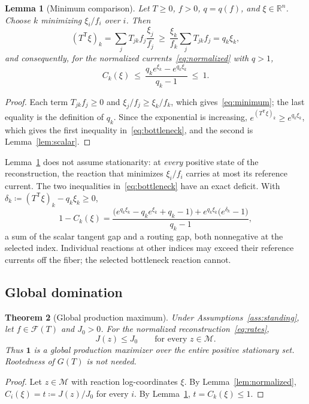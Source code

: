 \documentclass[11pt,a4paper]{article}
\theoremstyle{plain}
\newtheorem{theorem}{Theorem}[section]
\newtheorem{lemma}[theorem]{Lemma}
\theoremstyle{definition}
\theoremstyle{remark}
\numberwithin{equation}{section}
\newcommand{\R}{\mathbb{R}}
\newcommand{\T}{\mathsf{T}}
\newcommand{\one}{\mathbf{1}}
\newcommand{\cone}{\mathcal{F}}
\newcommand{\fiber}{\mathcal{M}}
\begin{document}
\begin{lemma}[Minimum comparison]\label{lem:minimum}
Let $T\ge0$, $f>0$, $q=q(f)$, and $\xi\in\R^n$. Choose $k$ minimizing $\xi_i/f_i$ over $i$. Then
\begin{equation}\label{eq:minimum}
 (T^{\T}\xi)_k=\sum_jT_{jk}f_j\frac{\xi_j}{f_j}\ \ge\ \frac{\xi_k}{f_k}\sum_jT_{jk}f_j=q_k\xi_k ,
\end{equation}
and consequently, for the normalized currents~\eqref{eq:normalized} with $q>1$,
\begin{equation}\label{eq:bottleneck}
 C_k(\xi)\ \le\ \frac{q_ke^{\xi_k}-e^{q_k\xi_k}}{q_k-1}\ \le\ 1 .
\end{equation}
\end{lemma}
\begin{proof}
Each term $T_{jk}f_j\ge0$ and $\xi_j/f_j\ge\xi_k/f_k$, which gives~\eqref{eq:minimum}; the last equality is the definition of $q_k$. Since the exponential is increasing, $e^{(T^{\T}\xi)_k}\ge e^{q_k\xi_k}$, which gives the first inequality in~\eqref{eq:bottleneck}, and the second is Lemma~\ref{lem:scalar}.
\end{proof}

Lemma~\ref{lem:minimum} does not assume stationarity: at \emph{every} positive state of the reconstruction, the reaction that minimizes $\xi_i/f_i$ carries at most its reference current. The two inequalities in~\eqref{eq:bottleneck} have an exact deficit. With $\delta_k\coloneqq(T^{\T}\xi)_k-q_k\xi_k\ge0$,
\begin{equation}\label{eq:gap}
 1-C_k(\xi)=\frac{\big(e^{q_k\xi_k}-q_ke^{\xi_k}+q_k-1\big)+e^{q_k\xi_k}\big(e^{\delta_k}-1\big)}{q_k-1},
\end{equation}
a sum of the scalar tangent gap and a routing gap, both nonnegative at the selected index. Individual reactions at other indices may exceed their reference currents off the fiber; the selected bottleneck reaction cannot.

\subsection{Global domination}

\begin{theorem}[Global production maximum]\label{thm:global}
Under Assumptions~\ref{ass:standing}, let $f\in\cone(T)$ and $J_0>0$. For the normalized reconstruction~\eqref{eq:rates},
\[
 J(z)\le J_0\qquad\text{for every }z\in\fiber .
\]
Thus $\one$ is a global production maximizer over the entire positive stationary set. Rootedness of $G(T)$ is not needed.
\end{theorem}
\begin{proof}
Let $z\in\fiber$ with reaction log-coordinates $\xi$. By Lemma~\ref{lem:normalized}, $C_i(\xi)=t\coloneqq J(z)/J_0$ for every $i$. By Lemma~\ref{lem:minimum}, $t=C_k(\xi)\le1$.
\end{proof}
\end{document}
